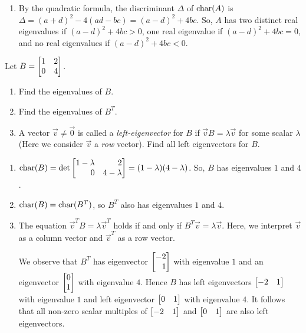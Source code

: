 \begin{exercises}
\begin{problist}
\begin{solution}
\begin{enumerate}
				\item By the quadratic formula, the discriminant $\Delta$ of
					$\operatorname{char}(A)$ is $\Delta = (a + d)^{2} - 4(ad - bc) =
					(a - d)^{2} + 4 bc$. So, $A$ has two distinct real
					eigenvalues if $(a - d)^{2} + 4bc > 0$, one real eigenvalue
					if $(a - d)^{2} + 4bc = 0$, and no real
					eigenvalues if $(a - d)^{2} + 4bc < 0.$
			\end{enumerate}
		\end{solution}

		\prob Let $B=\mat{1&2\\0&4}$.
		\begin{enumerate}
			\item Find the eigenvalues of $B$.

			\item Find the eigenvalues of $B^{T}$.

			\item A vector $\vec v\neq\vec 0$ is called a \emph{left-eigenvector}
				for $B$ if $\vec vB=\lambda \vec v$ for some scalar
				$\lambda$ (Here we consider $\vec v$ a \emph{row} vector).
				Find all left eigenvectors for $B$.
		\end{enumerate}


		\begin{solution}

			\begin{enumerate}
				\item $\Char(B) = \det\mat{1 -\lambda & 2 \\ 0 & 4 - \lambda}=
					(1 - \lambda)(4 - \lambda)$. So, $B$ has
					eigenvalues $1$ and $4$.

				\item $\operatorname{char}(B) = \operatorname{char}(B^{T})$, so $B^{T}$ also has
					eigenvalues $1$ and $4$.

				\item The equation $\vec{v}^{T}B = \lambda \vec{v}^{T}$ holds if and only if $B^{T}
					\vec{v}= \lambda \vec{v}$. Here, we interpret $\vec{v}$ as
					a column vector and $\vec{v}^{T}$ as a 
					row vector.

					We observe that $B^{T}$ has eigenvector
					$\mat{-2 \\ 1}$ with eigenvalue $1$ and an eigenvector
					$\mat{0\\1}$ with eigenvalue $4$. Hence $B$ has
					left eigenvectors $\mat{-2 & 1}$ with eigenvalue $1$
					and left eigenvector $\mat{0 & 1}$ with eigenvalue
					$4$. It follows that all non-zero scalar multiples of 
					$\mat{ -2 & 1 }$ and $\mat{ 0 & 1 }$
					are also left eigenvectors.
			\end{enumerate}
		\end{solution}


\end{problist}
\end{exercises}

